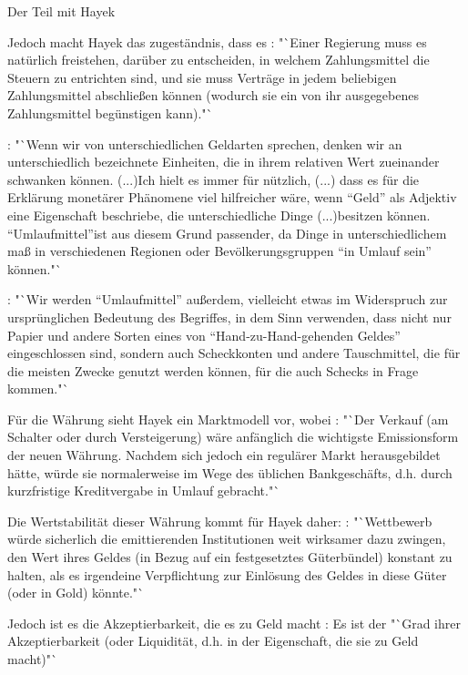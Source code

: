 \documentclass[
    onecolumn,
    a4paper,
    abstracton,
    parskip=half
    ,final
    ]{scrartcl}
\begin{document}
 Der Teil mit Hayek

Jedoch macht Hayek das zugest{\"a}ndnis, dass es \citep[vgl.][S.23]{Hayek1977}: "`Einer Regierung muss es nat{\"u}rlich freistehen, dar{\"u}ber zu entscheiden, in welchem Zahlungsmittel die Steuern zu entrichten sind, und sie muss Vertr{\"a}ge in jedem beliebigen Zahlungsmittel abschlie{\ss}en k{\"o}nnen (wodurch sie ein von ihr ausgegebenes Zahlungsmittel beg{\"u}nstigen kann)."`



\citep[vgl.][S.40f]{Hayek1977}: "`Wenn wir von unterschiedlichen Geldarten sprechen, denken wir an unterschiedlich bezeichnete Einheiten, die in ihrem relativen Wert zueinander schwanken k{\"o}nnen. (...)Ich hielt es immer f{\"u}r n{\"u}tzlich, (...) dass es f{\"u}r die Erkl{\"a}rung monet{\"a}rer Ph{\"a}nomene viel hilfreicher w{\"a}re, wenn "`Geld"' als Adjektiv eine Eigenschaft beschriebe, die unterschiedliche Dinge (...)besitzen k{\"o}nnen. "`Umlaufmittel"'ist aus diesem Grund passender, da Dinge in unterschiedlichem ma{\ss} in verschiedenen Regionen oder Bev{\"o}lkerungsgruppen "`in Umlauf sein"' k{\"o}nnen."`

\citep[vgl.][S.43]{Hayek1977}: "`Wir werden "`Umlaufmittel"' au{\ss}erdem, vielleicht etwas im Widerspruch zur urspr{\"u}nglichen Bedeutung des Begriffes, in dem Sinn verwenden, dass nicht nur Papier und andere Sorten eines von "`Hand-zu-Hand-gehenden Geldes"' eingeschlossen sind, sondern auch Scheckkonten und andere Tauschmittel, die f{\"u}r die meisten Zwecke genutzt werden k{\"o}nnen, f{\"u}r die auch Schecks in Frage kommen."`

F{\"u}r die W{\"a}hrung sieht Hayek ein Marktmodell vor, wobei \citep[vgl.][S.31]{Hayek1977}: "`Der Verkauf (am Schalter oder durch Versteigerung) w{\"a}re anf{\"a}nglich die wichtigste Emissionsform der neuen W{\"a}hrung. Nachdem sich jedoch ein regul{\"a}rer Markt herausgebildet h{\"a}tte, w{\"u}rde sie normalerweise im Wege des {\"u}blichen Bankgesch{\"a}fts, d.h. durch kurzfristige Kreditvergabe in Umlauf gebracht."`

Die Wertstabilit{\"a}t dieser W{\"a}hrung kommt f{\"u}r Hayek daher: \citep[vgl.][S.32]{Hayek1977}: "`Wettbewerb w{\"u}rde sicherlich die emittierenden Institutionen weit wirksamer dazu zwingen, den Wert ihres Geldes (in Bezug auf ein festgesetztes G{\"u}terb{\"u}ndel) konstant zu halten, als es irgendeine Verpflichtung zur Einl{\"o}sung des Geldes in diese G{\"u}ter (oder in Gold) k{\"o}nnte."`

Jedoch ist es die Akzeptierbarkeit, die es zu Geld macht \citep[vgl.][S.40]{Hayek1977}: Es ist der "`Grad ihrer Akzeptierbarkeit (oder Liquidit{\"a}t, d.h. in der Eigenschaft, die sie zu Geld macht)"`
\end{document}
